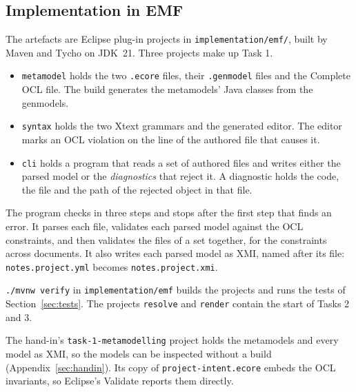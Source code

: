 \subsection{Implementation in EMF}
\label{sec:implementation}

The artefacts are Eclipse plug-in projects in \texttt{implementation/emf/},
built by Maven and Tycho on JDK~21. Three projects make up Task 1.

\begin{itemize}
  \item \texttt{metamodel} holds the two \texttt{.ecore} files, their
    \texttt{.genmodel} files and the Complete OCL file. The build generates the
    metamodels' Java classes from the genmodels.
  \item \texttt{syntax} holds the two Xtext grammars and the generated editor.
    The editor marks an OCL violation on the line of the authored file that
    causes it.
  \item \texttt{cli} holds a program that reads a set of authored files and
    writes either the parsed model or the \emph{diagnostics} that reject it. A
    diagnostic holds the code, the file and the path of the rejected object in
    that file.
\end{itemize}

The program checks in three steps and stops after the first step that finds an
error. It parses each file, validates each parsed model against the OCL
constraints, and then validates the files of a set together, for the
constraints across documents. It also writes each parsed model as XMI, named
after its file: \texttt{notes.project.yml} becomes \texttt{notes.project.xmi}.

\texttt{./mvnw verify} in \texttt{implementation/emf} builds the projects and
runs the tests of Section~\ref{sec:tests}. The projects \texttt{resolve} and
\texttt{render} contain the start of Tasks 2 and 3.

The hand-in's \texttt{task-1-metamodelling} project holds the metamodels and
every model as XMI, so the models can be inspected without a build
(Appendix~\ref{sec:handin}). Its copy of \texttt{project-intent.ecore} embeds
the OCL invariants, so Eclipse's Validate reports them directly.
